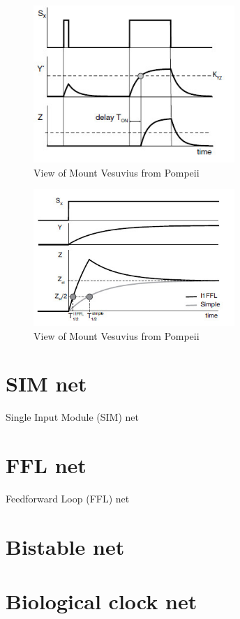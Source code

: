 \begin{figure}[h!]
\centering
\includegraphics[width=3in]
{autoregulons/c1-ffl-up-down.jpg}
\caption{View of Mount Vesuvius from
  Pompeii}
\label{fig-c1-ffl-up-down}
\end{figure}

\begin{figure}[h!]
\centering
\includegraphics[width=3in]
{autoregulons/i1-ffl.jpg}
\caption{View of Mount Vesuvius from
  Pompeii}
\label{fig-i1-ffl}
\end{figure}






\section{SIM net}
Single Input Module (SIM) net

\section{FFL net}

Feedforward Loop (FFL) net

\section{Bistable net}

\section{Biological clock net}